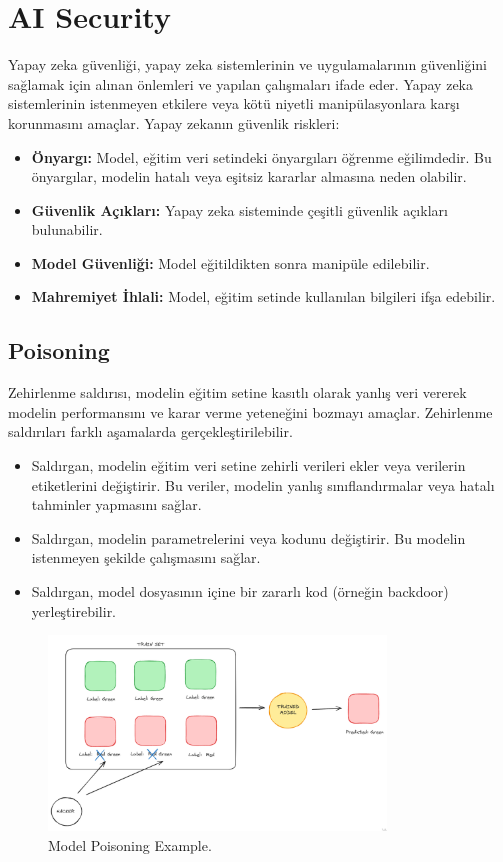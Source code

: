 \section{AI Security}
Yapay zeka güvenliği, yapay zeka sistemlerinin ve uygulamalarının güvenliğini sağlamak için alınan önlemleri ve yapılan çalışmaları ifade eder. Yapay zeka sistemlerinin istenmeyen etkilere veya kötü niyetli manipülasyonlara karşı korunmasını amaçlar. Yapay zekanın güvenlik riskleri:
\begin{itemize}
    \item \textbf{Önyargı:} Model, eğitim veri setindeki önyargıları öğrenme eğilimdedir. Bu önyargılar, modelin hatalı veya eşitsiz kararlar almasına neden olabilir.
    \item \textbf{Güvenlik Açıkları:} Yapay zeka sisteminde çeşitli güvenlik açıkları bulunabilir.
    \item \textbf{Model Güvenliği:} Model eğitildikten sonra manipüle edilebilir.
    \item \textbf{Mahremiyet İhlali:} Model, eğitim setinde kullanılan bilgileri ifşa edebilir.
\end{itemize}

\newpage

\subsection{Poisoning}
Zehirlenme saldırısı, modelin eğitim setine kasıtlı olarak yanlış veri vererek modelin performansını ve karar verme yeteneğini bozmayı amaçlar. Zehirlenme saldırıları farklı aşamalarda gerçekleştirilebilir.
\begin{itemize}
    \item Saldırgan, modelin eğitim veri setine zehirli verileri ekler veya verilerin etiketlerini değiştirir. Bu veriler, modelin yanlış sınıflandırmalar veya hatalı tahminler yapmasını sağlar.
    \item Saldırgan, modelin parametrelerini veya kodunu değiştirir. Bu modelin istenmeyen şekilde çalışmasını sağlar.
    \item Saldırgan, model dosyasının içine bir zararlı kod (örneğin backdoor) yerleştirebilir.
\end{itemize}

\newpage

\begin{figure}[h]
  \centering
  \includegraphics[width=0.8\textwidth]{images/ai_sec_poisoning_attack.png}
  \caption{Model Poisoning Example.}
\end{figure}

